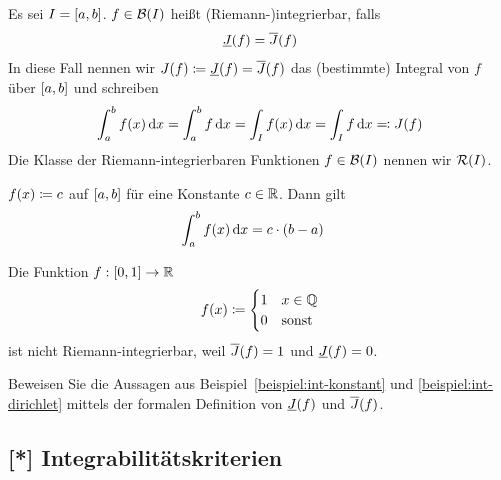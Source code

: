 \begin{definition}[Integral]
    Es sei $I=\left[a,b\right]$. $f\in \mB\of{I}$ heißt (Riemann-)integrierbar, falls
    \begin{align*}
        \underline{J}\of{f} = \overline{J}\of{f}
    \end{align*}
    In diese Fall nennen wir $J(f) \definedas \underline{J}\of{f} = \overline{J}\of{f}$ das (bestimmte) Integral von $f$ über $\left[a,b\right]$ und schreiben
    \begin{align*}
        \int_{a}^{b} f(x) \mathop{}\!\mathrm{d} x = \int_{a}^{b} f\mathop{}\!\mathrm{d} x = \int_{I} f(x)\mathop{}\!\mathrm{d} x = \int_{I} f\mathop{}\!\mathrm{d} x \eqqcolon J(f)
    \end{align*}
    Die Klasse der Riemann-integrierbaren Funktionen $f\in \mB\of{I}$ nennen wir $\mR\of{I}$.
\end{definition}

\begin{beispiel}
    \marginnote{[18. Apr]}
    \label{beispiel:int-konstant}
    $f(x) \coloneqq c$ auf $\left[a,b\right]$ für eine Konstante $c\in\mathbb{R}$. Dann gilt
    \begin{align*}
        \int_{a}^{b} f\of{x} \dif x &= c\cdot\pair{b-a}
    \end{align*}
\end{beispiel}

\begin{beispiel}
    \label{beispiel:int-dirichlet}
    Die Funktion $f: \left[0,1\right]\rightarrow{}\mathbb{R}$
    \begin{align*}
        f(x) \coloneqq \begin{cases}
                            1 &x\in \mathbb{Q}\\
                            0 &\text{sonst}
        \end{cases}
    \end{align*}
    ist nicht Riemann-integrierbar, weil $\overline{J}\of{f} = 1$ und $\underline{J}\of{f} = 0$.
\end{beispiel}

\begin{uebung}
    Beweisen Sie die Aussagen aus Beispiel~\ref{beispiel:int-konstant} und \ref{beispiel:int-dirichlet} mittels der formalen Definition von $\un{J}\of{f}$ und $\ov{J}\of{f}$.
\end{uebung}

\subsection{[*] Integrabilitätskriterien}

